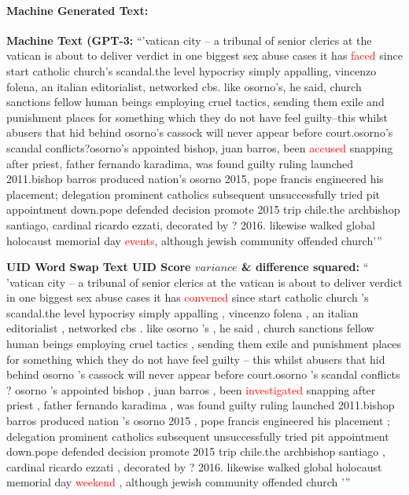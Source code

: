 \documentclass{article}
\begin{document}
\paragraph{Machine Generated Text:}
\hfill \break \textbf{Machine Text (GPT-3:} “'vatican city -- a tribunal of senior clerics at the vatican is about to deliver verdict in one biggest sex abuse cases it has \textcolor{red}{faced} since start catholic church's scandal.the level hypocrisy simply appalling, vincenzo folena, an italian editorialist, networked cbs. like osorno's, he said, church sanctions fellow human beings employing cruel tactics, sending them exile and punishment places for something which they do not have feel guilty--this whilst abusers that hid behind osorno's cassock will never appear before court.osorno's scandal conflicts?osorno's appointed bishop, juan barros, been \textcolor{red}{accused} snapping after priest, father fernando karadima, was found guilty ruling launched 2011.bishop barros produced nation's osorno 2015, pope francis engineered his placement; delegation prominent catholics subsequent unsuccessfully tried pit appointment down.pope defended decision promote 2015 trip chile.the archbishop santiago, cardinal ricardo ezzati, decorated by ? 2016. likewise walked global holocaust memorial day \textcolor{red}{events}, although jewish community offended church'”

\hfill \break \textbf{UID Word Swap Text UID Score $variance$ \& difference squared:} “ 'vatican city -- a tribunal of senior clerics at the vatican is about to deliver verdict in one biggest sex abuse cases it has \textcolor{red}{convened} since start catholic church 's scandal.the level hypocrisy simply appalling , vincenzo folena , an italian editorialist , networked cbs . like osorno 's , he said , church sanctions fellow human beings employing cruel tactics , sending them exile and punishment places for something which they do not have feel guilty -- this whilst abusers that hid behind osorno 's cassock will never appear before court.osorno 's scandal conflicts ? osorno 's appointed bishop , juan barros , been \textcolor{red}{investigated} snapping after priest , father fernando karadima , was found guilty ruling launched 2011.bishop barros produced nation 's osorno 2015 , pope francis engineered his placement ; delegation prominent catholics subsequent unsuccessfully tried pit appointment down.pope defended decision promote 2015 trip chile.the archbishop santiago , cardinal ricardo ezzati , decorated by ? 2016. likewise walked global holocaust memorial day \textcolor{red}{weekend} , although jewish community offended church '”
\end{document}
